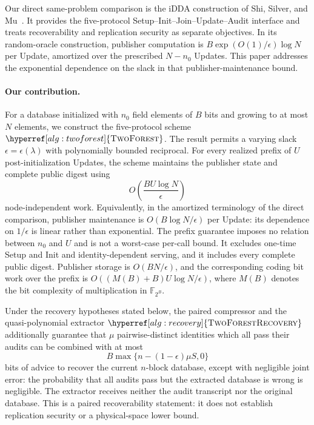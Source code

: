 \documentclass[11pt]{article}
\begin{document}
Our direct same-problem comparison is the iDDA construction of Shi, Silver,
and Mu~\cite{ShiSilverMu2026}.  It provides the five-protocol
Setup--Init--Join--Update--Audit interface and treats recoverability and
replication security as separate objectives.  In its random-oracle
construction, publisher computation is
$B\exp(O(1)/\epsilon)\log N$ per Update, amortized over the prescribed
$N-n_0$ Updates.  This paper addresses the exponential dependence on the
slack in that publisher-maintenance bound.

\paragraph{Our contribution.}
For a database initialized with $n_0$ field elements of $B$ bits and growing
to at most $N$ elements, we construct the five-protocol scheme
$\hyperref[alg:twoforest]{\textsc{TwoForest}}$.  The result permits a varying
slack $\epsilon=\epsilon(\lambda)$ with polynomially bounded reciprocal.  For
every realized prefix of $U$ post-initialization Updates, the scheme maintains
the publisher state and complete public digest using
\[
 O\!\left(\frac{BU\log N}{\epsilon}\right)
\]
node-independent work.  Equivalently, in the amortized terminology of the
direct comparison, publisher maintenance is
$O(B\log N/\epsilon)$ per Update: its dependence on $1/\epsilon$ is linear
rather than exponential.  The prefix guarantee imposes no relation between
$n_0$ and $U$ and is not a worst-case per-call bound.  It excludes one-time
Setup and Init and identity-dependent serving, and it includes every complete
public digest.  Publisher storage is $O(BN/\epsilon)$, and the corresponding
coding bit work over the prefix is
$O((M(B)+B)U\log N/\epsilon)$, where $M(B)$ denotes the bit complexity of
multiplication in $\mathbb F_{2^B}$.

Under the recovery hypotheses stated below, the paired compressor and the
quasi-polynomial extractor
$\hyperref[alg:recovery]{\textsc{TwoForestRecovery}}$ additionally guarantee
that $\mu$ pairwise-distinct identities which all pass their audits can be
combined with at most
\[
 B\max\{n-(1-\epsilon)\mu S,0\}
\]
bits of advice to recover the current $n$-block database, except with
negligible joint error: the probability that all audits pass but the extracted
database is wrong is negligible.  The extractor receives neither the audit
transcript nor the original database.  This is a paired recoverability
statement: it does not establish replication security or a physical-space
lower bound.
\end{document}
